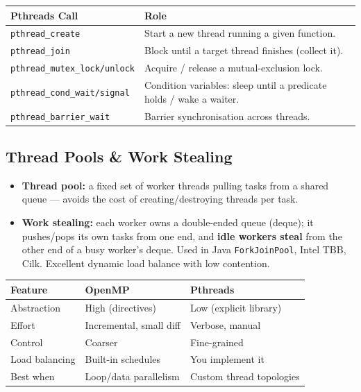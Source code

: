 \documentclass[11pt,a4paper]{article}
\begin{document}
\begin{longtable}{@{}p{5.2cm}p{8.8cm}@{}}
\toprule
\rowcolor{primary!15}
\textbf{Pthreads Call} & \textbf{Role} \\
\midrule
\endhead
\texttt{pthread\_create} & Start a new thread running a given function. \\
\texttt{pthread\_join} & Block until a target thread finishes (collect it). \\
\texttt{pthread\_mutex\_lock/unlock} & Acquire / release a mutual-exclusion lock. \\
\texttt{pthread\_cond\_wait/signal} & Condition variables: sleep until a predicate holds / wake a waiter. \\
\texttt{pthread\_barrier\_wait} & Barrier synchronisation across threads. \\
\bottomrule
\end{longtable}

\subsection{Thread Pools \& Work Stealing}
\begin{itemize}[leftmargin=*, itemsep=2pt]
  \item \textbf{Thread pool:} a fixed set of worker threads pulling tasks from a shared queue --- avoids the cost of creating/destroying threads per task.
  \item \textbf{Work stealing:} each worker owns a double-ended queue (deque); it pushes/pops its own tasks from one end, and \textbf{idle workers steal} from the other end of a busy worker's deque. Used in Java \texttt{ForkJoinPool}, Intel TBB, Cilk. Excellent dynamic load balance with low contention.
\end{itemize}

\begin{longtable}{@{}p{3.4cm}p{5.2cm}p{5.2cm}@{}}
\toprule
\rowcolor{primary!15}
\textbf{Feature} & \textbf{OpenMP} & \textbf{Pthreads} \\
\midrule
\endhead
Abstraction & High (directives) & Low (explicit library) \\
Effort & Incremental, small diff & Verbose, manual \\
Control & Coarser & Fine-grained \\
Load balancing & Built-in schedules & You implement it \\
Best when & Loop/data parallelism & Custom thread topologies \\
\bottomrule
\end{longtable}
\end{document}

